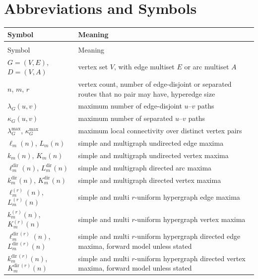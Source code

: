 \chapter*{Abbreviations and Symbols}
\begingroup
\setlength{\LTleft}{0pt}
\setlength{\LTright}{\fill}
\begin{longtable}{@{}>{\raggedright\arraybackslash}p{}>{\raggedright\arraybackslash}p{}@{}}
\toprule
Symbol & Meaning \\
\midrule
\endfirsthead
\multicolumn{2}{@{}l}{\textit{Abbreviations and Symbols (continued)}}\\
\toprule
Symbol & Meaning \\
\midrule
\endhead
\bottomrule
\endfoot
$G=(V,E)$, $D=(V,A)$ & vertex set $V$, with edge multiset $E$ or arc multiset $A$ \\
$n$, $m$, $r$ & vertex count, number of edge-disjoint or separated routes that no pair may have, hyperedge size \\
$\lambda_G(u,v)$ & maximum number of edge-disjoint $u$--$v$ paths \\
$\kappa_G(u,v)$ & maximum number of separated $u$--$v$ paths \\
$\lambda_G^{\max}$, $\kappa_G^{\max}$ & maximum local connectivity over distinct vertex pairs \\
$\ell_m(n)$, $L_m(n)$ & simple and multigraph undirected edge maxima \\
$k_m(n)$, $K_m(n)$ & simple and multigraph undirected vertex maxima \\
$\ell_m^{\mathrm{dir}}(n)$, $L_m^{\mathrm{dir}}(n)$ & simple and multigraph directed arc maxima \\
$k_m^{\mathrm{dir}}(n)$, $K_m^{\mathrm{dir}}(n)$ & simple and multigraph directed vertex maxima \\
$\ell_m^{(r)}(n)$, $L_m^{(r)}(n)$ & simple and multi $r$-uniform hypergraph edge maxima \\
$k_m^{(r)}(n)$, $K_m^{(r)}(n)$ & simple and multi $r$-uniform hypergraph vertex maxima \\
$\ell_m^{\mathrm{dir}\,(r)}(n)$, $L_m^{\mathrm{dir}\,(r)}(n)$ & simple and multi $r$-uniform hypergraph directed edge maxima, forward model unless stated \\
$k_m^{\mathrm{dir}\,(r)}(n)$, $K_m^{\mathrm{dir}\,(r)}(n)$ & simple and multi $r$-uniform hypergraph directed vertex maxima, forward model unless stated \\

\end{longtable}
